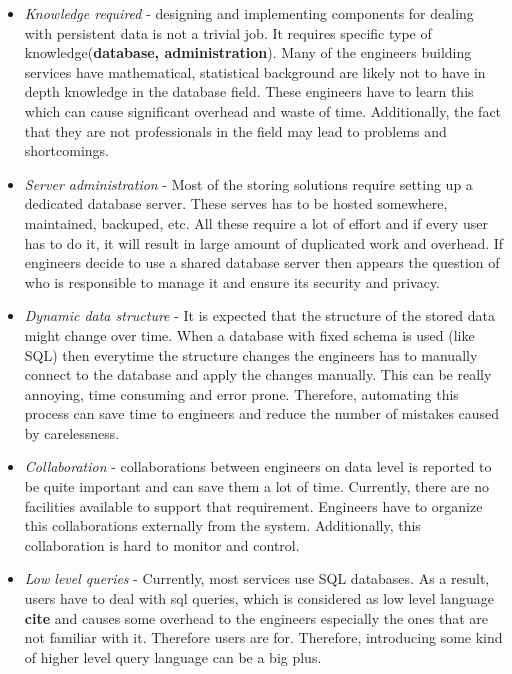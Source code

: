 \documentclass[a4paper, notitlepage]{article}
\begin{document}
\begin{itemize}
	\item \textit{Knowledge required} - designing and implementing components for dealing with persistent data is not a trivial job. It requires specific type of knowledge(\textbf{database, administration}). Many of the engineers building services have mathematical, statistical background are likely not to have in depth knowledge in the database field. These engineers have to learn this which can cause significant overhead and waste of time. Additionally, the fact that they are not professionals in the field may lead to problems and shortcomings.
	
	\item \textit{Server administration} - Most of the storing solutions require setting up a dedicated database server. These serves has to be hosted somewhere, maintained, backuped, etc. All these require a lot of effort and if every user has to do it, it will result in large amount of duplicated work and overhead. If engineers decide to use a shared database server then appears the question of who is responsible to manage it and ensure its security and privacy.
	
	\item \textit{Dynamic data structure} - It is expected that the structure of the stored data might change over time. When a database with fixed schema is used (like SQL) then everytime the structure changes the engineers has to manually connect to the database and apply the changes manually. This can be really annoying, time consuming and error prone. Therefore, automating this process can save time to engineers and reduce the number of mistakes caused by carelessness. 
	
	\item \textit{Collaboration} - collaborations between engineers on data level is reported to be quite important and can save them a lot of time. Currently, there are no facilities available to support that requirement. Engineers have to organize this collaborations externally from the system. Additionally, this collaboration is hard to monitor and control.
	
	\item \textit{Low level queries} - Currently, most services use SQL databases. As a result, users have to deal with sql queries, which is considered as low level language \textbf{cite} and causes some overhead to the engineers especially the ones that are not familiar with it. Therefore users are for. Therefore, introducing some kind of higher level query language can be a big plus.
	

\end{itemize}
\end{document}

